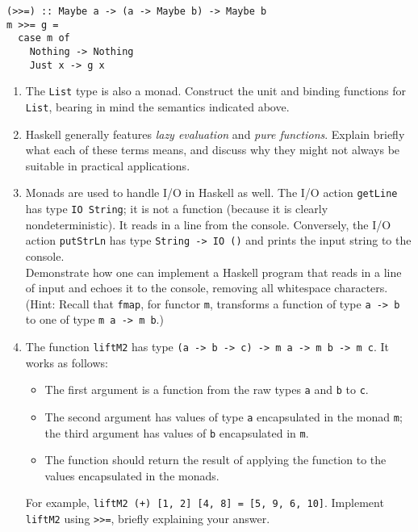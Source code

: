 \documentclass[12pt, a4paper]{article}
\begin{document}
\begin{enumerate}
\begin{lstlisting}
(>>=) :: Maybe a -> (a -> Maybe b) -> Maybe b
m >>= g =
  case m of
    Nothing -> Nothing
    Just x -> g x        
\end{lstlisting}
\lstset{
  language = C,
  basicstyle = \ttfamily \small,
  numbers = left,
  numberstyle = \footnotesize,
  showstringspaces = false
}

\begin{enumerate}
\item The \texttt{List} type is also a monad. Construct the unit and binding functions for \texttt{List}, bearing in mind the semantics indicated above. %

\item Haskell generally features \textit{lazy evaluation} and \textit{pure functions}. Explain briefly what each of these terms means, and discuss why they might not always be suitable in practical applications. %

\item Monads are used to handle I/O in Haskell as well. The I/O action \texttt{getLine} has type \texttt{IO String}; it is not a function (because it is clearly nondeterministic). It reads in a line from the console. Conversely, the I/O action \texttt{putStrLn} has type \texttt{String -> IO ()} and prints the input string to the console. \\[12pt]
Demonstrate how one can implement a Haskell program that reads in a line of input and echoes it to the console, removing all whitespace characters. \\[12pt]
(Hint: Recall that \texttt{fmap}, for functor \texttt{m}, transforms a function of type \texttt{a -> b} to one of type \texttt{m a -> m b}.) %

\item The function \texttt{liftM2} has type \texttt{(a -> b -> c) -> m a -> m b -> m c}. It works as follows:
\begin{itemize}
\item The first argument is a function from the raw types \texttt{a} and \texttt{b} to \texttt{c}.
\item The second argument has values of type \texttt{a} encapsulated in the monad \texttt{m}; the third argument has values of \texttt{b} encapsulated in \texttt{m}.
\item The function should return the result of applying the function to the values encapsulated in the monads.
\end{itemize}
For example, \texttt{liftM2 (+) [1, 2] [4, 8] = [5, 9, 6, 10]}. Implement \texttt{liftM2} using \texttt{>>=}, briefly explaining your answer. %


\end{enumerate}
\end{enumerate}
\end{document}
